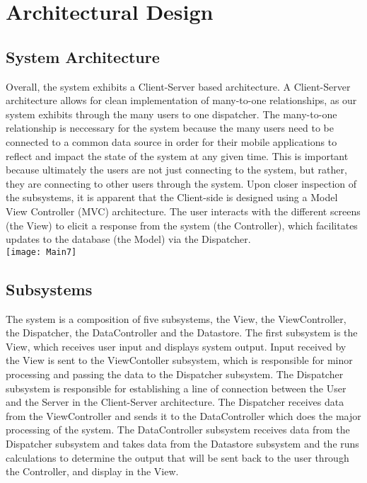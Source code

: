 \documentclass[english]{article}
\begin{document}
\section{Architectural Design}
\label{sec:architectural_design}

\subsection{System Architecture}
\label{sub:system_architecture}
    
Overall, the system exhibits a Client-Server based architecture. A Client-Server architecture allows for clean implementation of many-to-one relationships, as our system exhibits through the many users to one dispatcher. The many-to-one relationship is neccessary for the system because the many users need to be connected to a common data source in order for their mobile applications to reflect and impact the state of the system at any given time. This is important because ultimately the users are not just connecting to the system, but rather, they are connecting to other users through the system. 
\newline
\newline
Upon closer inspection of the subsystems, it is apparent that the Client-side is designed using a Model View Controller (MVC) architecture. The user interacts with the different screens (the View) to elicit a response from the system (the Controller), which facilitates updates to the database (the Model) via the Dispatcher.
\\

\texttt{[image: Main7]}

\subsection{Subsystems}
\label{sub:subsystems}
The system is a composition of five subsystems, the View, the ViewController, the Dispatcher, the DataController and the Datastore. The first subsystem is the View, which receives user input and displays system output. Input received by the View is sent to the ViewContoller subsystem, which is responsible for minor processing and passing the data to the Dispatcher subsystem. The Dispatcher subsystem is responsible for establishing a line of connection between the User and the Server in the Client-Server architecture. The Dispatcher receives data from the ViewController and sends it to the DataController which does the major processing of the system. The DataController subsystem receives data from the Dispatcher subsystem and takes data from the Datastore subsystem and the runs calculations to determine the output that will be sent back to the user through the Controller, and display in the View. 
\end{document}
